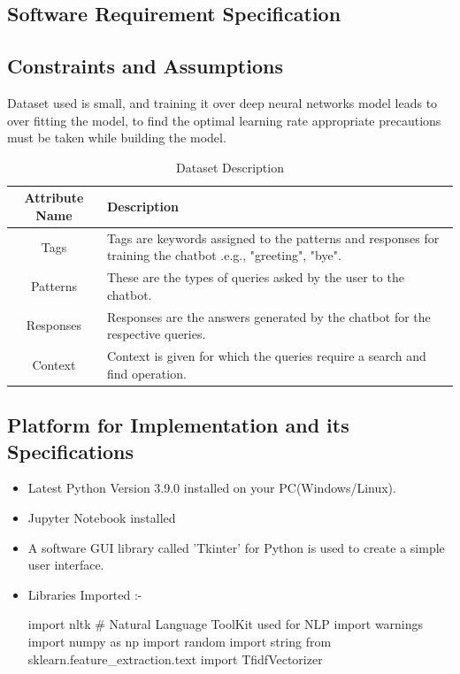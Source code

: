 \documentclass[12pt,a4paper]{report}     %
\begin{document}
\begin{normalsize}
{{\section{Software Requirement Specification}
{\setlength{\baselineskip}{1.1\baselineskip}
}
\subsection{Constraints and Assumptions}
{\setlength{\baselineskip}{1.1\baselineskip}
Dataset used is small, and training it over deep neural networks model leads to over fitting the model, to find the optimal learning rate appropriate precautions must be taken while building the model.
\begin{center}
\begin{table}[htp]
\label{Dataset Description}
\begin{tabular}{|c|p{12cm}|}
\cline{1-2}
Attribute Name  & Description \\
\hline
Tags & Tags are keywords assigned to the patterns and responses for training the chatbot .e.g., "greeting", "bye". \\
\hline
Patterns & These are the types of queries asked by the user to the chatbot. \\
\hline
Responses &  Responses are the answers generated by the chatbot for the respective queries.\\
\hline
Context & Context is given for which the queries require a search and find operation.\\
\hline
\end{tabular}
\caption{Dataset Description}
\end{table}
\end{center}
}

\subsection{Platform for Implementation and its Specifications}
\begin{itemize}
    \item Latest Python Version 3.9.0 installed on your PC(Windows/Linux).
    \item Jupyter Notebook installed
    \item A software GUI library called 'Tkinter' for Python is used to create a simple user interface.
    \item Libraries Imported :- \\
    \begin{python}
    import nltk # Natural Language ToolKit used for NLP
    import warnings
    import numpy as np
    import random
    import string 
    from sklearn.feature_extraction.text import TfidfVectorizer
    \end{python}
\end{itemize}
\par
\newpage
}}
\end{normalsize}
\end{document}
